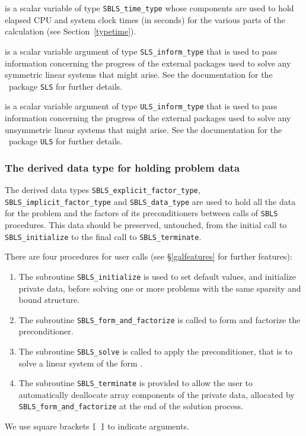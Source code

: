 \documentclass{galahad}
\newcommand{\packagename}{SBLS}
\begin{document}
\begin{description}
 is a scalar variable of type {\tt \packagename\_time\_type}
whose components are used to hold elapsed CPU and system clock times
(in seconds) for the various parts of the calculation
(see Section~\ref{typetime}).

 is a scalar variable argument of type
{\tt SLS\_inform\_type} that is used to pass information
concerning the progress of the external packages used to solve any symmetric
linear systems that might arise.
See the documentation for the \galahad\ package {\tt SLS} for further details.

 is a scalar variable argument of type
{\tt ULS\_inform\_type} that is used to pass information
concerning the progress of the external packages used to solve any unsymmetric
linear systems that might arise.
See the documentation for the \galahad\ package {\tt ULS} for further details.
\end{description}


\subsubsection{The derived data type for holding problem data}\label{typedata}
The derived data types
{\tt \packagename\_explicit\_factor\_type},
{\tt \packagename\_implicit\_factor\_type} and
{\tt \packagename\_data\_type}
are used to hold all the data for the problem and the factors of
its preconditioners between calls of
{\tt \packagename} procedures.
This data should be preserved, untouched, from the initial call to
{\tt \packagename\_initialize}
to the final call to
{\tt \packagename\_terminate}.


\galarguments
There are four procedures for user calls
(see \S\ref{galfeatures} for further features):

\begin{enumerate}
\item The subroutine
      {\tt \packagename\_initialize}
      is used to set default values, and initialize private data,
      before solving one or more problems with the
      same sparsity and bound structure.
\item The subroutine
      {\tt \packagename\_form\_and\_factorize}
      is called to form and factorize the preconditioner.
\item The subroutine
      {\tt \packagename\_solve}
      is called to apply the preconditioner, that is to solve a linear
      system of the form .
\item The subroutine
      {\tt \packagename\_terminate}
      is provided to allow the user to automatically deallocate array
       components of the private data, allocated by
       {\tt \packagename\_form\_and\_factorize}
       at the end of the solution process.
\end{enumerate}
We use square brackets {\tt [ ]} to indicate \optional arguments.
\end{document}
